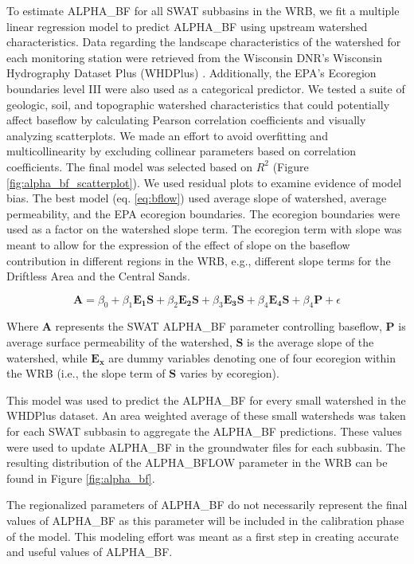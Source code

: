 	To estimate ALPHA\_BF for all SWAT subbasins in the WRB, we fit a multiple linear regression model to predict ALPHA\_BF using upstream watershed characteristics. Data regarding the landscape characteristics of the watershed for each monitoring station were retrieved from the Wisconsin DNR's Wisconsin Hydrography Dataset Plus (WHDPlus) \citep{wdnr_whdplus_2013}. Additionally, the EPA's Ecoregion boundaries level III were also used as a categorical predictor. We tested a suite of geologic, soil, and topographic watershed characteristics that could potentially affect baseflow by calculating Pearson correlation coefficients and visually analyzing scatterplots. We made an effort to avoid overfitting and multicollinearity by excluding collinear parameters based on correlation coefficients. The final model was selected based on $R^2$ (Figure \ref{fig:alpha_bf_scatterplot}). We used residual plots to examine evidence of model bias. The best model (eq. \ref{eq:bflow}) used average slope of watershed, average permeability, and the EPA ecoregion boundaries. The ecoregion boundaries were used as a factor on the watershed slope term. The ecoregion term with slope was meant to allow for the expression of the effect of slope on the baseflow contribution in different regions in the WRB, e.g., different slope terms for the Driftless Area and the Central Sands.

	\begin{equation}
	\bm{A} = \beta_0 + 
		\beta_1 \bm{E_1} \bm{S} +
		\beta_2 \bm{E_2} \bm{S} + 
		\beta_3 \bm{E_3} \bm{S} +
		\beta_4 \bm{E_4} \bm{S} +
		\beta_4 \bm{P} + 
		\epsilon
		\label{eq:bflow}
	\end{equation}
	
	Where $\bm{A}$ represents the SWAT ALPHA\_BF parameter controlling baseflow, $\bm{P}$ is average surface permeability of the watershed, $\bm{S}$ is the average slope of the watershed, while $\bm{E_x}$ are dummy variables denoting one of four ecoregion within the WRB (i.e., the slope term of $\bm{S}$ varies by ecoregion).
	
	This model was used to predict the ALPHA\_BF for every small watershed in the WHDPlus dataset. An area weighted average of these small watersheds was taken for each SWAT subbasin to aggregate the ALPHA\_BF predictions. These values were used to update ALPHA\_BF in the groundwater files for each subbasin. The resulting distribution of the ALPHA\_BFLOW parameter in the WRB can be found in Figure \ref{fig:alpha_bf}.
	
	The regionalized parameters of ALPHA\_BF do not necessarily represent the final values of ALPHA\_BF as this parameter will be included in the calibration phase of the model. This modeling effort was meant as a first step in creating accurate and useful values of ALPHA\_BF.
